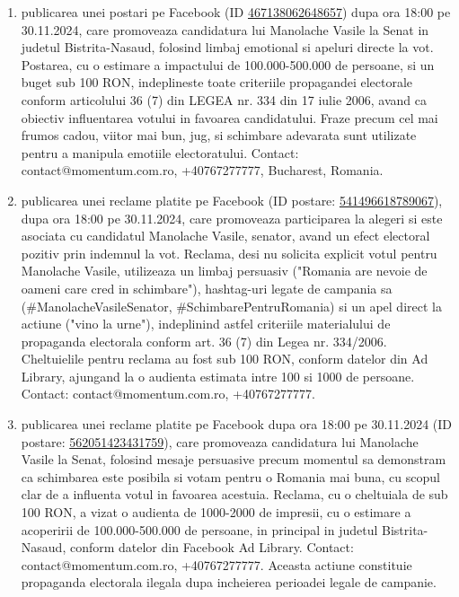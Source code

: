 \documentclass[a4paper,12pt]{article}
\begin{document}
\begin{enumerate}[leftmargin=*, label=\arabic*.)]
    \item publicarea unei postari pe Facebook (ID \href{https://www.facebook.com/ads/library/?id=467138062648657}{467138062648657}) dupa ora 18:00 pe 30.11.2024, care promoveaza candidatura lui Manolache Vasile la Senat in judetul Bistrita-Nasaud, folosind limbaj emotional si apeluri directe la vot. Postarea, cu o estimare a impactului de 100.000-500.000 de persoane,  si un buget sub 100 RON, indeplineste toate criteriile propagandei electorale conform articolului 36 (7) din LEGEA nr. 334 din 17 iulie 2006, avand ca obiectiv influentarea votului in favoarea candidatului.  Fraze precum cel mai frumos cadou, viitor mai bun, jug, si schimbare adevarata sunt utilizate pentru a manipula emotiile electoratului.  Contact: contact@momentum.com.ro, +40767277777, Bucharest, Romania.
    \item publicarea unei reclame platite pe Facebook (ID postare: \href{https://www.facebook.com/ads/library/?id=541496618789067}{541496618789067}), dupa ora 18:00 pe 30.11.2024, care promoveaza participarea la alegeri si este asociata cu candidatul Manolache Vasile, senator, avand un efect electoral pozitiv prin indemnul la vot.  Reclama, desi nu solicita explicit votul pentru Manolache Vasile, utilizeaza un limbaj persuasiv ("Romania are nevoie de oameni care cred in schimbare"),  hashtag-uri legate de campania sa (\#ManolacheVasileSenator, \#SchimbarePentruRomania) si un apel direct la actiune ("vino la urne"),  indeplinind astfel criteriile materialului de propaganda electorala conform art. 36 (7) din Legea nr. 334/2006.  Cheltuielile pentru reclama au fost sub 100 RON, conform datelor din Ad Library,  ajungand la o audienta estimata intre 100 si 1000 de persoane.  Contact: contact@momentum.com.ro, +40767277777.
    \item publicarea unei reclame platite pe Facebook dupa ora 18:00 pe 30.11.2024 (ID postare: \href{https://www.facebook.com/ads/library/?id=562051423431759}{562051423431759}), care promoveaza candidatura lui Manolache Vasile la Senat, folosind mesaje persuasive precum momentul sa demonstram ca schimbarea este posibila si votam pentru o Romania mai buna, cu scopul clar de a influenta votul in favoarea acestuia.  Reclama, cu o cheltuiala de sub 100 RON, a vizat o audienta de 1000-2000 de impresii, cu o estimare a acoperirii de 100.000-500.000 de persoane, in principal in judetul Bistrita-Nasaud, conform datelor din Facebook Ad Library.  Contact: contact@momentum.com.ro, +40767277777.  Aceasta actiune constituie propaganda electorala ilegala dupa incheierea perioadei legale de campanie.

\end{enumerate}
\end{document}
